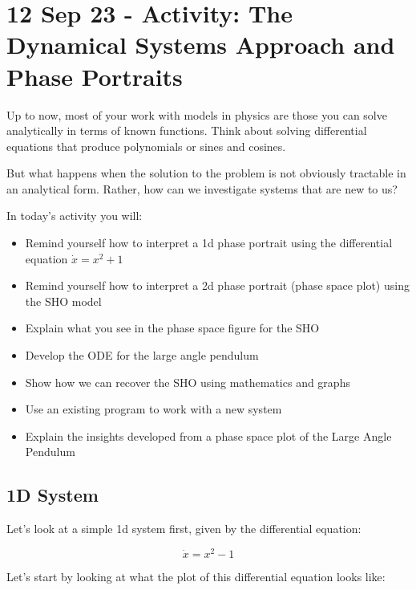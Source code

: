\section{12 Sep 23 - Activity: The Dynamical Systems Approach and Phase
Portraits}\label{sep-23---activity-the-dynamical-systems-approach-and-phase-portraits}

Up to now, most of your work with models in physics are those you can
solve analytically in terms of known functions. Think about solving
differential equations that produce polynomials or sines and cosines.

But what happens when the solution to the problem is not obviously
tractable in an analytical form. Rather, how can we investigate systems
that are new to us?

In today's activity you will:

\begin{itemize}
\tightlist
\item
  Remind yourself how to interpret a 1d phase portrait using the
  differential equation \(\dot{x} = x^2 + 1\)
\item
  Remind yourself how to interpret a 2d phase portrait (phase space
  plot) using the SHO model
\item
  Explain what you see in the phase space figure for the SHO
\item
  Develop the ODE for the large angle pendulum
\item
  Show how we can recover the SHO using mathematics and graphs
\item
  Use an existing program to work with a new system
\item
  Explain the insights developed from a phase space plot of the Large
  Angle Pendulum
\end{itemize}

\subsection{1D System}\label{d-system}

Let's look at a simple 1d system first, given by the differential
equation:

\[
\dot{x} = x^2 - 1
\]

Let's start by looking at what the plot of this differential equation
looks like:

